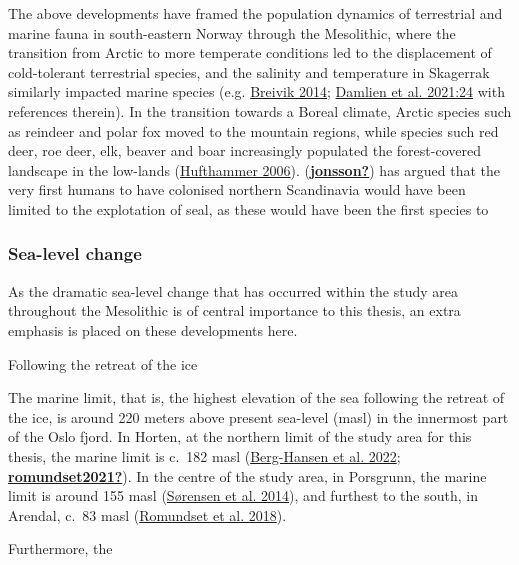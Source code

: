\documentclass[
  a4paper,
  oneside]{uiophdthesis}
\begin{document}
The above developments have framed the population dynamics of terrestrial and marine fauna in south-eastern Norway through the Mesolithic, where the transition from Arctic to more temperate conditions led to the displacement of cold-tolerant terrestrial species, and the salinity and temperature in Skagerrak similarly impacted marine species (e.g. \protect\hyperlink{ref-breivik2014}{Breivik 2014}; \protect\hyperlink{ref-damlien2021}{Damlien et al. 2021:24} with references therein). In the transition towards a Boreal climate, Arctic species such as reindeer and polar fox moved to the mountain regions, while species such red deer, roe deer, elk, beaver and boar increasingly populated the forest-covered landscape in the low-lands (\protect\hyperlink{ref-hufthammer2006}{Hufthammer 2006}). (\protect\hyperlink{ref-jonsson}{\textbf{jonsson?}}) has argued that the very first humans to have colonised northern Scandinavia would have been limited to the explotation of seal, as these would have been the first species to

\hypertarget{sea-level-change}{%
\subsubsection{Sea-level change}\label{sea-level-change}}

As the dramatic sea-level change that has occurred within the study area throughout the Mesolithic is of central importance to this thesis, an extra emphasis is placed on these developments here.

Following the retreat of the ice

The marine limit, that is, the highest elevation of the sea following the retreat of the ice, is around 220 meters above present sea-level (masl) in the innermost part of the Oslo fjord. In Horten, at the northern limit of the study area for this thesis, the marine limit is c.~182 masl (\protect\hyperlink{ref-berg-hansen2022}{Berg-Hansen et al. 2022}; \protect\hyperlink{ref-romundset2021}{\textbf{romundset2021?}}). In the centre of the study area, in Porsgrunn, the marine limit is around 155 masl (\protect\hyperlink{ref-suxf8rensen2014}{Sørensen et al. 2014}), and furthest to the south, in Arendal, c.~83 masl (\protect\hyperlink{ref-romundset2018}{Romundset et al. 2018}).

Furthermore, the
\end{document}
